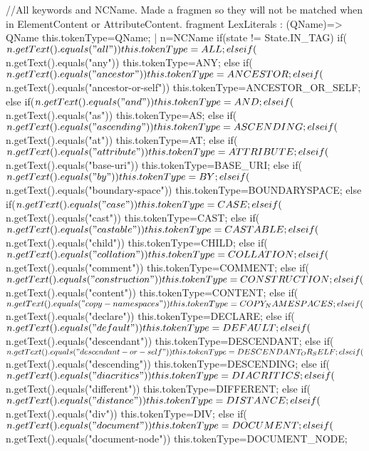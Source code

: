 //All keywords and NCName. Made a fragmen so they will not be matched when in ElementContent or AttributeContent.
fragment LexLiterals  : (QName)=> QName {this.tokenType=QName;}
            | n=NCName{
         if(state != State.IN_TAG){
         if($n.getText().equals("all")) this.tokenType=ALL;
         else if($n.getText().equals("any")) this.tokenType=ANY;
         else if($n.getText().equals("ancestor")) this.tokenType=ANCESTOR;
         else if($n.getText().equals("ancestor-or-self")) this.tokenType=ANCESTOR_OR_SELF;
         else if($n.getText().equals("and")) this.tokenType=AND;
         else if($n.getText().equals("as")) this.tokenType=AS;
         else if($n.getText().equals("ascending")) this.tokenType=ASCENDING;
         else if($n.getText().equals("at")) this.tokenType=AT;
         else if($n.getText().equals("attribute")) this.tokenType=ATTRIBUTE;
         else if($n.getText().equals("base-uri")) this.tokenType=BASE_URI;
         else if($n.getText().equals("by")) this.tokenType=BY;
         else if($n.getText().equals("boundary-space")) this.tokenType=BOUNDARYSPACE;
         else if($n.getText().equals("case")) this.tokenType=CASE;
         else if($n.getText().equals("cast")) this.tokenType=CAST;
         else if($n.getText().equals("castable")) this.tokenType=CASTABLE;
         else if($n.getText().equals("child")) this.tokenType=CHILD;
         else if($n.getText().equals("collation")) this.tokenType=COLLATION;
         else if($n.getText().equals("comment")) this.tokenType=COMMENT;
         else if($n.getText().equals("construction")) this.tokenType=CONSTRUCTION;
         else if($n.getText().equals("content")) this.tokenType=CONTENT;
         else if($n.getText().equals("copy-namespaces")) this.tokenType=COPY_NAMESPACES;
         else if($n.getText().equals("declare")) this.tokenType=DECLARE;
         else if($n.getText().equals("default")) this.tokenType=DEFAULT;
         else if($n.getText().equals("descendant")) this.tokenType=DESCENDANT;
         else if($n.getText().equals("descendant-or-self")) this.tokenType=DESCENDANT_OR_SELF;
         else if($n.getText().equals("descending")) this.tokenType=DESCENDING;
         else if($n.getText().equals("diacritics")) this.tokenType=DIACRITICS;
         else if($n.getText().equals("different")) this.tokenType=DIFFERENT;
         else if($n.getText().equals("distance")) this.tokenType=DISTANCE;
         else if($n.getText().equals("div")) this.tokenType=DIV;
         else if($n.getText().equals("document")) this.tokenType=DOCUMENT;
         else if($n.getText().equals("document-node")) this.tokenType=DOCUMENT_NODE;
}}
